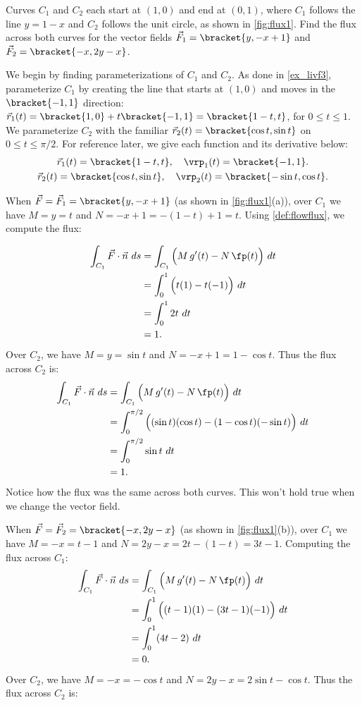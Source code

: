 {Curves $C_1$ and $C_2$ each start at $(1,0)$ and end at $(0,1)$, where $C_1$ follows the line $y=1-x$ and $C_2$ follows the unit circle, as shown in \autoref{fig:flux1}. Find the flux across both curves for the vector fields $\vec F_1 =\bracket{y,-x+1}$ and $\vec F_2 =\bracket{-x,2y-x}$.}
{We begin by finding parameterizations of $C_1$ and $C_2$. As done in \autoref{ex_livf3}, parameterize $C_1$ by creating the line that starts at $(1,0)$ and moves in the $\bracket{-1,1}$ direction: $\vec r_1(t) =\bracket{1,0}+t\bracket{-1,1}=\bracket{1-t,t}$, for $0\leq t\leq 1$. We parameterize $C_2$ with the familiar $\vec r_2(t) =\bracket{\cos t,\sin t}$ on $0\leq t\leq \pi/2$. For reference later, we give each function and its derivative below:
\begin{gather*}
\vec r_1(t) =\bracket{1-t,t},\quad\vrp_1(t)=\bracket{-1,1}.\\
\vec r_2(t) =\bracket{\cos t,\sin t}, \quad \vrp_2(t) =\bracket{-\sin t,\cos t}.
\end{gather*}

When $\vec F = \vec F_1 =\bracket{y,-x+1}$ (as shown in \autoref{fig:flux1}(a)), over $C_1$ we have $M = y =t$ and $N = -x+1 = -(1-t)+1 = t$. Using \autoref{def:flowflux}, we compute the flux:

\begin{align*}
\int_{C_1} \vec F\cdot \vec n\ ds & = \int_{C_1} \Big(M\,g'(t) - N\,\fp(t)\Big)\ dt\\
			&= \int_0^1 \Big( t(1) - t(-1)\Big)\ dt \\
			&= \int_0^1 2t\ dt\\
			&= 1.
\end{align*}
Over $C_2$, we have $M = y = \sin t$ and $N = -x+1 = 1-\cos t$. Thus the flux across $C_2$ is:
\begin{align*}
	\int_{C_1} \vec F\cdot \vec n\ ds
	& = \int_{C_1} \Big(M\,g'(t) - N\,\fp(t)\Big)\ dt\\
	&= \int_0^{\pi/2}\Big((\sin t)(\cos t) - (1-\cos t)(-\sin t)\Big)\ dt\\
	&= \int_0^{\pi/2} \sin t\ dt\\
	&=1.
\end{align*}
Notice how the flux was the same across both curves. This won't hold true when we change the vector field.

When $\vec F=\vec F_2=\bracket{-x,2y-x}$ (as shown in \autoref{fig:flux1}(b)), over $C_1$ we have $M=-x=t-1$ and $N=2y-x=2t-(1-t)=3t-1$. Computing the flux across $C_1$:
\begin{align*}
	\int_{C_1} \vec F\cdot \vec n\ ds
	& = \int_{C_1} \Big(M\,g'(t) - N\,\fp(t)\Big)\ dt\\
	&= \int_0^1 \Big( (t-1)(1) - (3t-1)(-1)\Big)\ dt \\
	&= \int_0^1 (4t-2)\ dt\\
	&= 0.
\end{align*}
Over $C_2$, we have $M = -x = -\cos t$ and $N = 2y-x = 2\sin t-\cos t$. Thus the flux across $C_2$ is:

}
